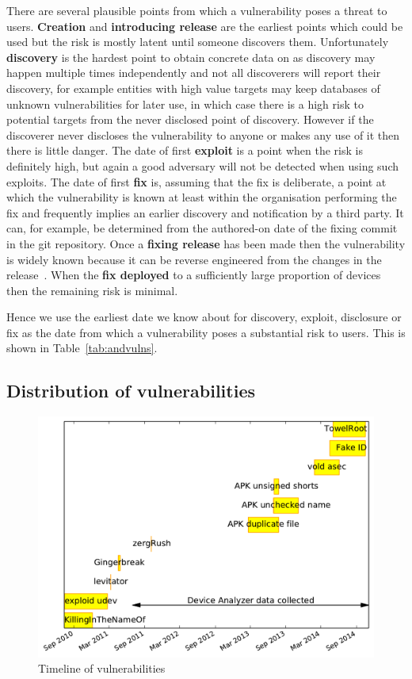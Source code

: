 \documentclass[conference,a4paper,twoside]{IEEEtran}
\begin{document}
There are several plausible points from which a vulnerability poses a threat to users.
{\bf Creation} and {\bf introducing release} are the earliest points which could be used but the risk is mostly latent until someone discovers them.
Unfortunately {\bf discovery} is the hardest point to obtain concrete data on as discovery may happen multiple times independently and not all discoverers will report their discovery, for example entities with high value targets may keep databases of unknown vulnerabilities for later use, in which case there is a high risk to potential targets from the never disclosed point of discovery.
However if the discoverer never discloses the vulnerability to anyone or makes any use of it then there is little danger.
The date of first {\bf exploit} is a point when the risk is definitely high, but again a good adversary will not be detected when using such exploits.
The date of first {\bf fix} is, assuming that the fix is deliberate, a point at which the vulnerability is known at least within the organisation performing the fix and frequently implies an earlier discovery and notification by a third party.
It can, for example, be determined from the authored-on date of the fixing commit in the git repository.
Once a {\bf fixing release} has been made then the vulnerability is widely known because it can be reverse engineered from the changes in the release~\cite{Brumley2008}.
When the {\bf fix deployed} to a sufficiently large proportion of devices then the remaining risk is minimal.

Hence we use the earliest date we know about for discovery, exploit, disclosure or fix as the date from which a vulnerability poses a substantial risk to users.
This is shown in Table~\ref{tab:andvulns}.


\subsection{Distribution of vulnerabilities}
\begin{figure}
 \centering
 \includegraphics[width=\columnwidth]{figures/vulnerabilities_timeline}
 \caption{Timeline of vulnerabilities}
 \label{fig:vulnerabilities_timeline}
\end{figure}
\end{document}
